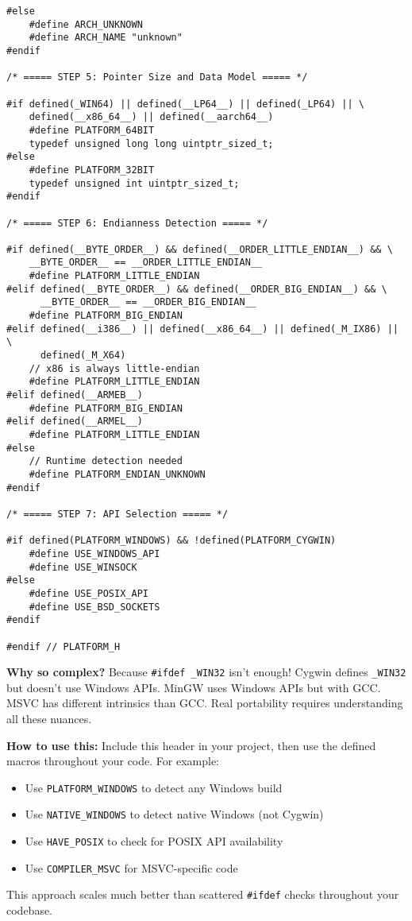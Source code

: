 \begin{lstlisting}
#else
    #define ARCH_UNKNOWN
    #define ARCH_NAME "unknown"
#endif

/* ===== STEP 5: Pointer Size and Data Model ===== */

#if defined(_WIN64) || defined(__LP64__) || defined(_LP64) || \
    defined(__x86_64__) || defined(__aarch64__)
    #define PLATFORM_64BIT
    typedef unsigned long long uintptr_sized_t;
#else
    #define PLATFORM_32BIT
    typedef unsigned int uintptr_sized_t;
#endif

/* ===== STEP 6: Endianness Detection ===== */

#if defined(__BYTE_ORDER__) && defined(__ORDER_LITTLE_ENDIAN__) && \
    __BYTE_ORDER__ == __ORDER_LITTLE_ENDIAN__
    #define PLATFORM_LITTLE_ENDIAN
#elif defined(__BYTE_ORDER__) && defined(__ORDER_BIG_ENDIAN__) && \
      __BYTE_ORDER__ == __ORDER_BIG_ENDIAN__
    #define PLATFORM_BIG_ENDIAN
#elif defined(__i386__) || defined(__x86_64__) || defined(_M_IX86) || \
      defined(_M_X64)
    // x86 is always little-endian
    #define PLATFORM_LITTLE_ENDIAN
#elif defined(__ARMEB__)
    #define PLATFORM_BIG_ENDIAN
#elif defined(__ARMEL__)
    #define PLATFORM_LITTLE_ENDIAN
#else
    // Runtime detection needed
    #define PLATFORM_ENDIAN_UNKNOWN
#endif

/* ===== STEP 7: API Selection ===== */

#if defined(PLATFORM_WINDOWS) && !defined(PLATFORM_CYGWIN)
    #define USE_WINDOWS_API
    #define USE_WINSOCK
#else
    #define USE_POSIX_API
    #define USE_BSD_SOCKETS
#endif

#endif // PLATFORM_H
\end{lstlisting}

\begin{notebox}
\textbf{Why so complex?} Because \texttt{\#ifdef \_WIN32} isn't enough! Cygwin defines \texttt{\_WIN32} but doesn't use Windows APIs. MinGW uses Windows APIs but with GCC. MSVC has different intrinsics than GCC. Real portability requires understanding all these nuances.

\textbf{How to use this:} Include this header in your project, then use the defined macros throughout your code. For example:
\begin{itemize}
    \item Use \texttt{PLATFORM\_WINDOWS} to detect any Windows build
    \item Use \texttt{NATIVE\_WINDOWS} to detect native Windows (not Cygwin)
    \item Use \texttt{HAVE\_POSIX} to check for POSIX API availability
    \item Use \texttt{COMPILER\_MSVC} for MSVC-specific code
\end{itemize}

This approach scales much better than scattered \texttt{\#ifdef} checks throughout your codebase.
\end{notebox}


